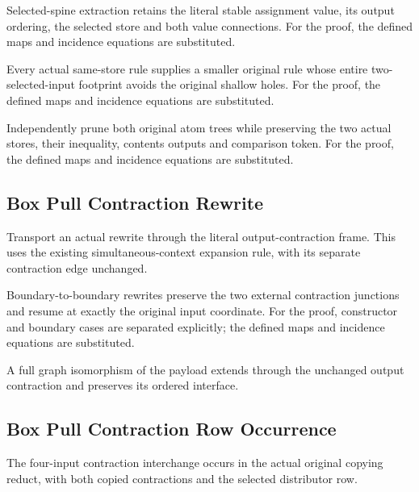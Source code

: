 Selected-spine extraction retains the literal stable assignment value, its output ordering, the selected store and both value connections.
For the proof, the defined maps and incidence equations are substituted.
\par{}

Every actual same-store rule supplies a smaller original rule whose entire two-selected-input footprint avoids the original shallow holes.
For the proof, the defined maps and incidence equations are substituted.
\par{}

Independently prune both original atom trees while preserving the two actual stores, their inequality, contents outputs and comparison token.
For the proof, the defined maps and incidence equations are substituted.
\par{}

\subsection{Box Pull Contraction Rewrite}
Transport an actual rewrite through the literal output-contraction frame. This uses the existing simultaneous-context expansion rule, with its separate contraction edge unchanged.

Boundary-to-boundary rewrites preserve the two external contraction junctions and resume at exactly the original input coordinate.
For the proof, constructor and boundary cases are separated explicitly; the defined maps and incidence equations are substituted.
\par{}

A full graph isomorphism of the payload extends through the unchanged output contraction and preserves its ordered interface.
\par{}

\subsection{Box Pull Contraction Row Occurrence}
The four-input contraction interchange occurs in the actual original copying reduct, with both copied contractions and the selected distributor row.

